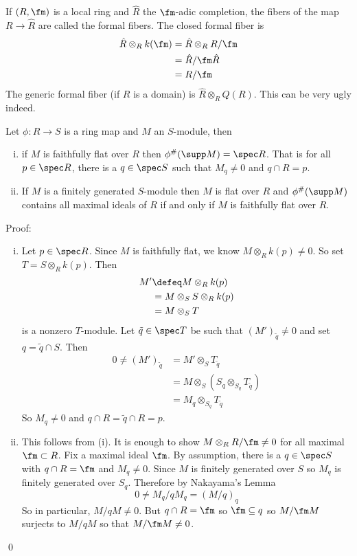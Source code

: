 \begin{ex}
If $(R,\fm)$ is a local ring and $\hat{R}$ the $\fm$-adic completion, the fibers of the map $R \to \hat{R}$ are called the formal fibers. The closed formal fiber is 
\[
\begin{split}
\hat{R} \otimes_R k(\fm) &= \hat{R} \otimes_R R/\fm \\
&= \hat{R}/\fm \hat{R} \\
&=R/\fm
\end{split}
\]
The generic formal fiber (if $R$ is a domain) is $\hat{R} \otimes_R Q(R)$. This can be very ugly indeed. 
\end{ex}

\begin{thmm}
Let $\phi: R \to S$ is a ring map and $M$ an $S$-module, then
\begin{enumerate}[(i)]
\item if $M$ is faithfully flat over $R$ then $\phi^\#(\supp M)=\spec R$. That is for all $p \in \spec R$, there is a $q \in \spec S$ such that $M_q \neq 0$ and $q \cap R=p$. 
\item If $M$ is a finitely generated $S$-module then $M$ is flat over $R$ and $\phi^\#(\supp M)$ contains all maximal ideals of $R$ if and only if $M$ is faithfully flat over $R$.
\end{enumerate}
\end{thmm}

\noindent Proof:
\begin{enumerate}[(i)]
\item Let $p \in \spec R$. Since $M$ is faithfully flat, we know $M \otimes_R k(p) \neq 0$. So set $T=S \otimes_R k(p)$. Then 
\[
\begin{split}
M' &\defeq M \otimes_R k(p) \\
&=M \otimes_S S \otimes_R k(p) \\
&= M \otimes_S T
\end{split}
\]
is a nonzero $T$-module. Let $\tilde{q} \in \spec T$ be such that $(M')_{\tilde{q}} \neq 0$ and set $q= \tilde{q} \cap S$. Then 
\[
\begin{split}
0 \neq (M')_{\tilde{q}} &=M' \otimes_S T_{\tilde{q}} \\
&=M \otimes_S (S_q \otimes_{S_q} T_{\tilde{q}} ) \\
&= M_q \otimes_{S_q} T_{\tilde{q}}
\end{split}
\]
So $M_q \neq 0$ and $q \cap R=\tilde{q} \cap R=p$.

\item This follows from (i). It is enough to show $M \otimes_R R/\fm \neq 0$ for all maximal $\fm \subset R$. Fix a maximal ideal $\fm$. By assumption, there is a $q \in \spec S$ with $q \cap R=\fm$ and $M_q \neq 0$. Since $M$ is finitely generated over $S$ so $M_q$ is finitely generated over $S_q$. Therefore by Nakayama's Lemma
\[
0 \neq M_q/qM_q =(M/q)_q
\]
So in particular, $M/qM \neq 0$. But $q \cap R=\fm$ so $\fm \subseteq q$ so $M/\fm M$ surjects to $M/qM$ so that $M/\fm M\neq 0$. 
\end{enumerate}
\qed \\

